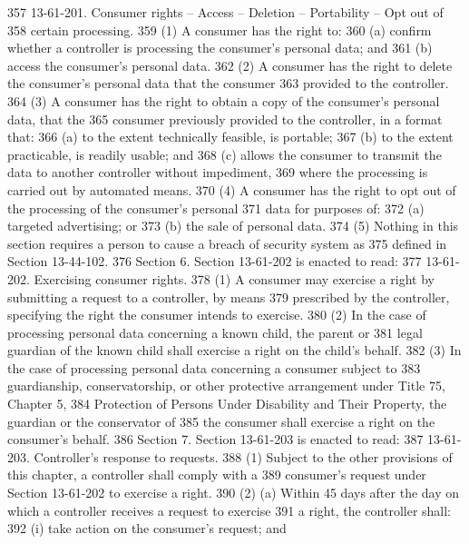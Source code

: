 357          13-61-201. Consumer rights -- Access -- Deletion -- Portability -- Opt out of
358     certain processing.
359          (1) A consumer has the right to:
360          (a) confirm whether a controller is processing the consumer's personal data; and
361          (b) access the consumer's personal data.
362          (2) A consumer has the right to delete the consumer's personal data that the consumer
363     provided to the controller.
364          (3) A consumer has the right to obtain a copy of the consumer's personal data, that the
365     consumer previously provided to the controller, in a format that:
366          (a) to the extent technically feasible, is portable;
367          (b) to the extent practicable, is readily usable; and
368          (c) allows the consumer to transmit the data to another controller without impediment,
369     where the processing is carried out by automated means.
370          (4) A consumer has the right to opt out of the processing of the consumer's personal
371     data for purposes of:
372          (a) targeted advertising; or
373          (b) the sale of personal data.
374          (5) Nothing in this section requires a person to cause a breach of security system as
375     defined in Section 13-44-102.
376          Section 6. Section 13-61-202 is enacted to read:
377          13-61-202. Exercising consumer rights.
378          (1) A consumer may exercise a right by submitting a request to a controller, by means
379     prescribed by the controller, specifying the right the consumer intends to exercise.
380          (2) In the case of processing personal data concerning a known child, the parent or
381     legal guardian of the known child shall exercise a right on the child's behalf.
382          (3) In the case of processing personal data concerning a consumer subject to
383     guardianship, conservatorship, or other protective arrangement under Title 75, Chapter 5,
384     Protection of Persons Under Disability and Their Property, the guardian or the conservator of
385     the consumer shall exercise a right on the consumer's behalf.
386          Section 7. Section 13-61-203 is enacted to read:
387          13-61-203. Controller's response to requests.
388          (1) Subject to the other provisions of this chapter, a controller shall comply with a
389     consumer's request under Section 13-61-202 to exercise a right.
390          (2) (a) Within 45 days after the day on which a controller receives a request to exercise
391     a right, the controller shall:
392          (i) take action on the consumer's request; and
